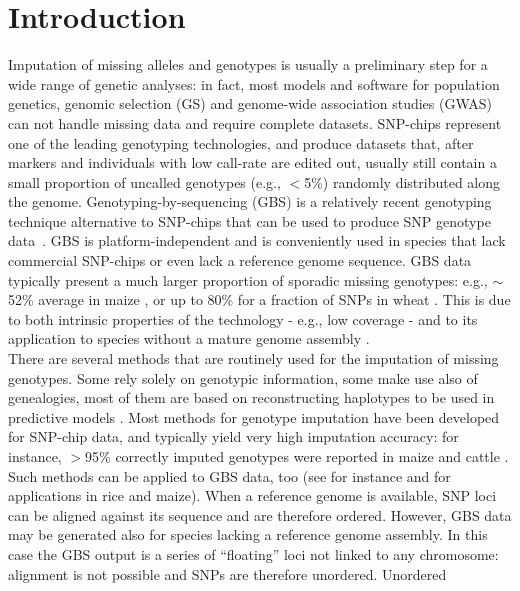 \section{Introduction}
\label{intro}

Imputation of missing alleles and genotypes is usually a preliminary step for
a wide range of genetic analyses: in fact, most models and software for 
population genetics, genomic selection (GS) and genome-wide association 
studies (GWAS) can not handle missing data and require complete datasets. 
SNP-chips represent one of the leading genotyping technologies, and produce 
datasets that, after markers and individuals with low call-rate are edited out, 
usually still contain a small proportion of uncalled genotypes (e.g., $<$5\%) 
randomly distributed along the genome. Genotyping-by-sequencing (GBS) is a 
relatively recent genotyping technique alternative to SNP-chips that can 
be used to produce SNP genotype data~\cite{elshire_robust_2011}.
GBS is platform-independent and is conveniently 
used in species that lack commercial SNP-chips or even lack a reference 
genome sequence. GBS data typically present a much larger proportion of 
sporadic missing genotypes: e.g., $\sim$52\% average in maize \cite{crossa_genomic_2013},
or up to 80\% for a fraction of SNPs in wheat \cite{poland_genomic_2012}. This 
is due to both intrinsic properties of the technology - e.g., low coverage - 
and to its application to species without a mature genome assembly \cite{glaubitz_tassel-gbs:_2014}.\\
There are several methods that are routinely used for the imputation of 
missing genotypes. Some rely solely on genotypic information, some make 
use also of genealogies, most of them are based on reconstructing haplotypes 
to be used in predictive models \cite{nicolazzi_software_2015}. Most methods for 
genotype imputation have been developed for SNP-chip data, and typically 
yield very high imputation accuracy: for instance, $>$95\% correctly imputed 
genotypes were reported in maize \cite{hickey_factors_2012} and cattle \cite{vanraden_genomic_2011}. 
Such methods can be applied to GBS data, too (see for instance 
\cite{huang_efficient_2014} and \cite{swarts_novel_2014} 
for applications in rice and maize). When a reference 
genome is available, SNP loci can be aligned against its sequence and 
are therefore ordered. However, GBS data may be generated 
also for species lacking a reference genome assembly. In this case the 
GBS output is a series of ``floating'' loci not linked to any chromosome: 
alignment is not possible and SNPs are therefore unordered. Unordered 
